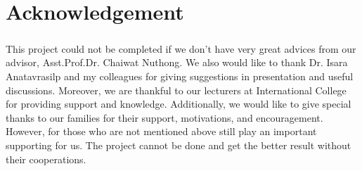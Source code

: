 \chapter*{Acknowledgement}
\paragraph{}This project could not be completed if we don't have very great advices from our advisor, Asst.Prof.Dr. Chaiwat Nuthong. We also would like to thank Dr. Isara Anatavrasilp and my colleagues for giving suggestions in presentation and useful discussions. Moreover, we are thankful to our lecturers at International College for providing support and knowledge. Additionally, we would like to give special thanks to our families for their support, motivations, and encouragement. However, for those who are not mentioned above still play an important supporting for us. The project cannot be done and get the better result without their cooperations.


